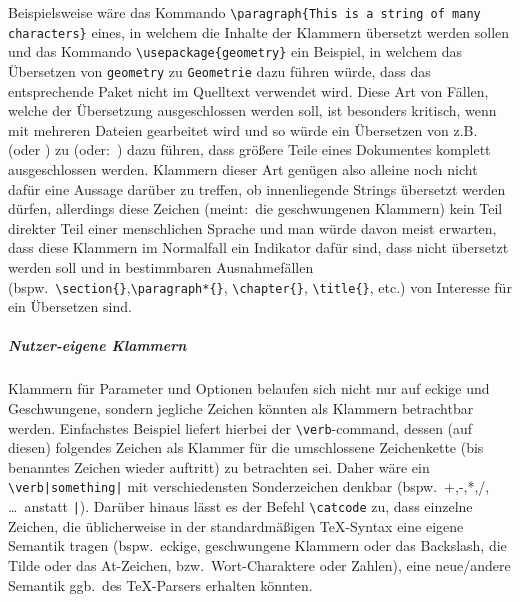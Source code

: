 Beispielsweise wäre das Kommando \verb|\paragraph{This is a string of many characters}| eines, in welchem die Inhalte der Klammern übersetzt werden sollen und das Kommando \verb|\usepackage{geometry}| ein Beispiel, in welchem das Übersetzen von \verb|geometry| zu \verb|Geometrie| dazu führen würde, dass das entsprechende Paket nicht im Quelltext verwendet wird. Diese Art von Fällen, welche der Übersetzung ausgeschlossen werden soll, ist besonders kritisch, wenn mit mehreren Dateien gearbeitet wird und so würde ein Übersetzen von z.B.\ \verb|| (oder \verb||) zu \verb|| (oder:\ \verb||) dazu führen, dass größere Teile eines Dokumentes komplett ausgeschlossen werden. 
Klammern dieser Art genügen also alleine noch nicht dafür eine Aussage darüber zu treffen, ob innenliegende Strings übersetzt werden dürfen, allerdings diese Zeichen (meint:\ die geschwungenen Klammern) kein Teil direkter Teil einer menschlichen Sprache und man würde davon meist erwarten, dass diese Klammern im Normalfall ein Indikator dafür sind, dass nicht übersetzt werden soll und in bestimmbaren Ausnahmefällen (bspw.\ \verb|\section{}|,\verb|\paragraph*{}|, \verb|\chapter{}|, \verb|\title{}|, etc.) von Interesse für ein Übersetzen sind. 

\subparagraph*{Nutzer-eigene Klammern}
Klammern für Parameter und Optionen belaufen sich nicht nur auf eckige und Geschwungene, sondern jegliche Zeichen könnten als Klammern betrachtbar werden. Einfachstes Beispiel liefert hierbei der \verb|\verb|-command, dessen (auf diesen) folgendes Zeichen als Klammer für die umschlossene Zeichenkette (bis benanntes Zeichen wieder auftritt) zu betrachten sei. Daher wäre ein \verb+\verb|something|+ mit verschiedensten Sonderzeichen denkbar (bspw.\ +,-,*,/, \ldots\ anstatt \verb/|/).
Darüber hinaus lässt es der Befehl \verb|\catcode| zu, dass einzelne Zeichen, die üblicherweise in der standardmäßigen \TeX{}-Syntax eine eigene Semantik tragen (bspw.\ eckige, geschwungene Klammern oder das Backslash, die Tilde oder das At-Zeichen, bzw.\ Wort-Charaktere oder Zahlen), eine neue/andere Semantik ggb.\ des \TeX{}-Parsers erhalten könnten.

